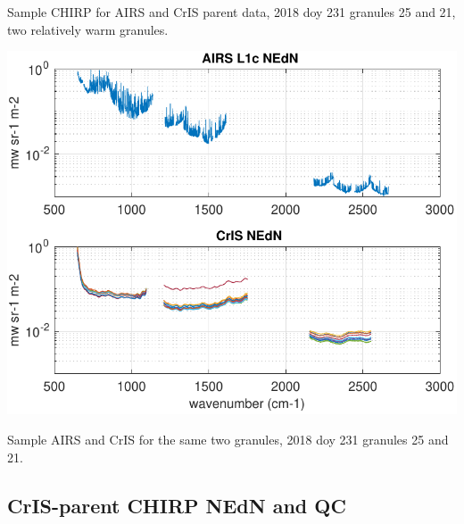 \documentclass[12pt]{article}
\begin{document}
Sample CHIRP {\nedn} for AIRS and CrIS parent data, 2018 doy
231 granules 25 and 21, two relatively warm granules.

  \begin{centering}
  \includegraphics[width=\textwidth]{figures/sample_airs_and_cris_nedn.pdf}
  \end{centering}\vspace{3mm}

Sample AIRS and CrIS {\nedn} for the same two granules, 2018 doy
231 granules 25 and 21.

\subsection{CrIS-parent CHIRP NEdN and QC}
\end{document}
